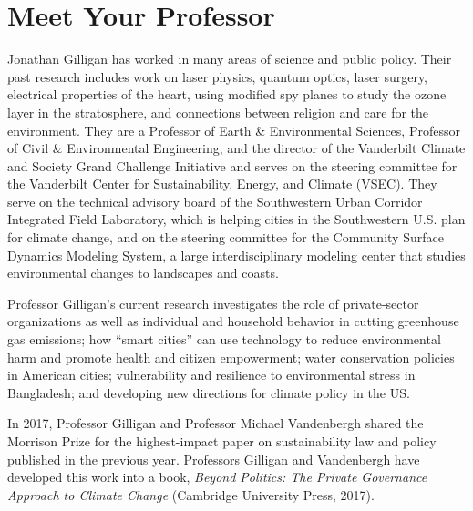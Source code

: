 \clearpage
\section{Meet Your Professor}
Jonathan Gilligan has worked in many areas of science and public policy.
Their past research includes work on laser physics, quantum optics,
laser surgery, electrical properties of the heart, using modified spy planes to
study the ozone layer in the stratosphere, and connections between religion and
care for the environment.
They are a Professor of Earth \& Environmental Sciences,
Professor of Civil \& Environmental Engineering,
and the director of the Vanderbilt Climate and Society Grand Challenge
Initiative and serves on the steering committee for the Vanderbilt Center for
Sustainability, Energy, and Climate (VSEC).
They serve on the technical advisory board of the
Southwestern Urban Corridor Integrated Field Laboratory, which is helping cities
in the Southwestern U.S. plan for climate change,
and on the steering committee for the
Community Surface Dynamics Modeling System, a large interdisciplinary modeling
center that studies environmental changes to landscapes and coasts.
\iffalse

Professor Gilligan joined the Vanderbilt Faculty in 1994 as a member of the
Department of Physics and Astronomy. In 2003, when the Department of Geology
became the Department of Earth and Environmental Science, Professor Gilligan
joined the new department to focus on atmospheric science, global climate change,
and the interactions of politics, ethics, religion, communication, and the
environment.
\fi

Professor Gilligan's current research investigates the role of private-sector
organizations as well as individual and household behavior in cutting
greenhouse gas emissions;
how ``smart cities'' can use technology to reduce environmental harm and
promote health and citizen empowerment;
water conservation policies in American cities;
vulnerability and resilience to environmental stress in Bangladesh;
and developing new directions for climate policy in the US.

In 2017, Professor Gilligan and Professor Michael Vandenbergh shared
the Morrison Prize for the highest-impact paper on sustainability law and
policy published in the previous year. Professors Gilligan and Vandenbergh
have developed this work into a book,
\emph{Beyond Politics: The Private Governance Approach to Climate Change\/}
(Cambridge University Press, 2017).

